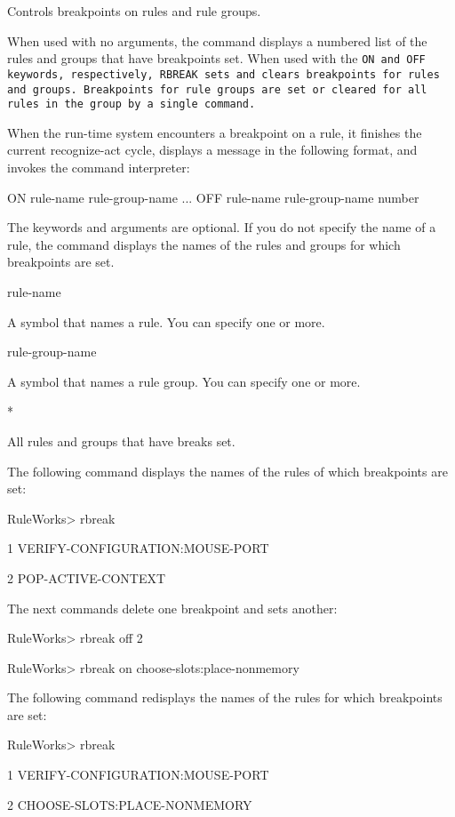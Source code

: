 {{Controls breakpoints on rules and rule groups.

When used with no arguments, the command displays a numbered list of
the rules and groups that have breakpoints set. When used with the
\tt{ON} and \tt{OFF} keywords, respectively, \tt{RBREAK} sets and
clears breakpoints for rules and groups. Breakpoints for rule groups
are set or cleared for all rules in the group by a single command.

When the run-time system encounters a breakpoint on a rule, it
finishes the current recognize-act cycle, displays a message in the
following format, and invokes the command interpreter:


\Format

ON
{
rule-name
rule-group-name
}...
OFF
{
rule-name
rule-group-name
number
}

The keywords and arguments are optional. If you do not
specify the name of a rule, the command displays the names of
the rules and groups for which breakpoints are set.

\Arguments

rule-name

A symbol that names a rule. You can specify one or more.

rule-group-name

A symbol that names a rule group. You can specify one or
more.

*

All rules and groups that have breaks set.

\Example

The following command displays the names of the rules of
which breakpoints are set:

RuleWorks> rbreak

1 VERIFY-CONFIGURATION:MOUSE-PORT

2 POP-ACTIVE-CONTEXT

The next commands delete one breakpoint and sets another:

RuleWorks> rbreak off 2

RuleWorks> rbreak on choose-slots:place-nonmemory

The following command redisplays the names of the rules for
which breakpoints are set:

RuleWorks> rbreak

1 VERIFY-CONFIGURATION:MOUSE-PORT

2 CHOOSE-SLOTS:PLACE-NONMEMORY

}}
